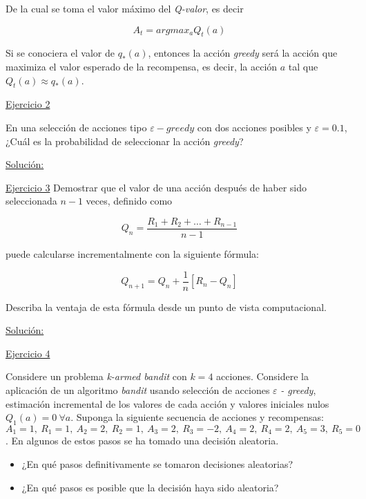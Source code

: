 \documentclass[12pt]{article}
\newlength\tindent
\renewcommand{\indent}{\hspace*{\tindent}}
\begin{document}
    De la cual se toma el valor máximo del \textit{Q-valor}, es decir

    \[
        A_{t} = argmax_{a}Q_{t}(a)
    \]

    Si se conociera el valor de $q_{*}(a)$, entonces la acción \textit{greedy} será la acción que maximiza el valor esperado de la recompensa, es decir, la acción $a$ tal que $Q_{t}(a) \approx q_{*}(a)$.

    \indent\underline{Ejercicio 2}

    En una selección de acciones tipo $\varepsilon-greedy$ con dos acciones posibles y $\varepsilon=0.1$, ¿Cuál es la probabilidad de seleccionar la acción \textit{greedy}?

    \indent\underline{Solución:}

    \indent\underline{Ejercicio 3}
    Demostrar que el valor de una acción después de haber sido seleccionada $n-1$ veces, definido como

    \[ Q_{n} = \frac{R_{1} + R_{2} + \ldots + R_{n-1}}{n-1} \]

    puede calcularse incrementalmente con la siguiente fórmula:


    \[ Q_{n+1} = Q_{n} + \frac{1}{n} \left[ R_{n} - Q_{n} \right] \]

    Describa la ventaja de esta fórmula desde un punto de vista computacional.

    \indent\underline{Solución:}


    \indent\underline{Ejercicio 4}

    Considere un problema \textit{k-armed bandit} con $k = 4$ acciones.
    Considere la aplicación de un algoritmo \textit{bandit} usando selección de acciones $\varepsilon$ \textit{- greedy}, estimación incremental de los valores de cada acción y valores iniciales nulos $Q_{1}(a) = 0\ \forall a$.
    Suponga la siguiente secuencia de acciones y recompensas: $A_{1}=1,\ R_{1}=1,\ A_{2}=2,\ R_{2}=1,\ A_{3}=2,\ R_{3}=-2,\ A_{4}=2,\ R_{4}=2,\ A_{5}=3,\ R_{5}=0$.
    En algunos de estos pasos se ha tomado una decisión aleatoria.

    \begin{itemize}
        \item ¿En qué pasos definitivamente se tomaron decisiones aleatorias?
        \item ¿En qué pasos es posible que la decisión haya sido aleatoria?
    \end{itemize}
\end{document}
